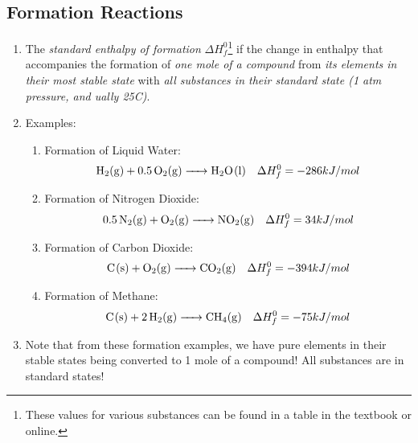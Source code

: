 \documentclass[../CHEM152Notes.tex]{subfiles}
\begin{document}
\subsection*{Formation Reactions}
\begin{enumerate}
    \item The \emph{standard enthalpy of formation} $\Delta H^0_f$\footnote{These values for various substances can be found in a table in the textbook or online.} if the change in enthalpy that accompanies the formation of \emph{one mole of a compound} from \emph{its elements in their most stable state} with \emph{all substances in their standard state (1 atm pressure, and ually 25C)}. 
    \item Examples:
        \begin{enumerate}
            \item Formation of Liquid Water:
                \begin{equation*}
                    \begin{aligned}
                        \ce{H2_(g) + 0.5 O2_(g) -> H2O_(l)} \quad \Delta H^0_f = -286 kJ/mol
                    \end{aligned}
                \end{equation*}
            \item Formation of Nitrogen Dioxide:
                \begin{equation*}
                    \begin{aligned}
                        \ce{0.5 N2_(g) + O2_(g) -> NO2_(g)} \quad \Delta H^0_f = 34 kJ/mol
                    \end{aligned}
                \end{equation*}
            \item Formation of Carbon Dioxide:
                \begin{equation*}
                    \begin{aligned}
                        \ce{C_(s) + O2_(g) -> CO2_(g)} \quad \Delta H^0_f = -394 kJ/mol
                    \end{aligned}
                \end{equation*}
            \item Formation of Methane:
                \begin{equation*}
                    \begin{aligned}
                        \ce{C_(s) + 2 H2_(g) -> CH4_(g)} \quad \Delta H^0_f = -75 kJ/mol
                    \end{aligned}
                \end{equation*}
        \end{enumerate}
    \item Note that from these formation examples, we have pure elements in their stable states being converted to 1 mole of a compound! All substances are in standard states!
\end{enumerate}
\end{document}
